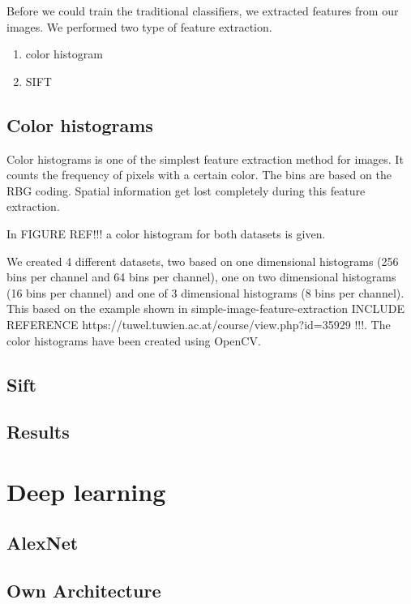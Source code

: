 \documentclass[11pt]{article}
\begin{document}
Before we could train the traditional classifiers, we extracted features from our images. We performed two type of feature extraction. 

\begin{enumerate}
\item{color histogram}
\item{SIFT}
\end{enumerate}

\subsection{Color histograms}
Color histograms is one of the simplest feature extraction method for images. It counts the frequency of pixels with a certain color. The bins are based on the RBG coding. Spatial information get lost completely during this feature extraction.

In FIGURE REF!!! a color histogram for both datasets is given.

We created 4 different datasets, two based on one dimensional histograms (256 bins per channel and 64 bins per channel), one on two dimensional histograms (16 bins per channel) and one of 3 dimensional histograms (8 bins per channel). This based on the example shown in simple-image-feature-extraction INCLUDE REFERENCE https://tuwel.tuwien.ac.at/course/view.php?id=35929 !!!. The color histograms have been created using OpenCV. 

\subsection{Sift}


\subsection{Results}

\section{Deep learning}


\subsection{AlexNet}

\subsection{Own Architecture}
\end{document}
